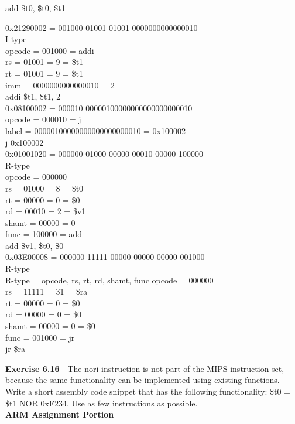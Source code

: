 \documentclass[12pt,a4paper]{report}
\begin{document}
\begin{normalsize}
add \$t0, \$t0, \$t1

0x21290002 = 001000 01001 01001 0000000000000010 \\
I-type \\
opcode = 001000 = addi \\
rs = 01001 = 9 = \$t1 \\
rt = 01001 = 9 = \$t1 \\
imm = 0000000000000010 = 2\\

addi \$t1, \$t1, 2 \\

0x08100002 = 000010 00000100000000000000000010 \\
opcode = 000010 = j \\
label = 00000100000000000000000010 = 0x100002 \\

j 0x100002 \\

0x01001020 = 000000 01000 00000 00010 00000 100000 \\
R-type \\
opcode = 000000 \\
rs = 01000 = 8 = \$t0 \\
rt = 00000 = 0 = \$0 \\
rd = 00010 = 2 = \$v1  \\
shamt = 00000 = 0 \\
func = 100000 = add \\

add \$v1, \$t0, \$0 \\

0x03E00008 = 000000 11111 00000 00000 00000 001000 \\
R-type \\
R-type = opcode, rs, rt, rd, shamt, func
opcode = 000000 \\
rs = 11111 = 31 = \$ra \\
rt = 00000 = 0 = \$0 \\
rd = 00000 = 0 = \$0 \\
shamt = 00000 = 0 = \$0 \\
func = 001000 = jr \\

jr \$ra \\

\medskip

\textbf{Exercise 6.16} - The nori instruction is not part of the MIPS instruction set, because the same functionality can be implemented using existing functions. Write a short assembly code snippet that has the following functionality: \$t0 = \$t1 NOR 0xF234. Use as few instructions as possible. \\



\textbf{ARM Assignment Portion}


\end{normalsize}
\end{document}
